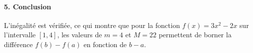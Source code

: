 \documentclass{article}
\newcounter{solution}
\begin{document}
\paragraph{5. Conclusion} L'inégalité est vérifiée, ce qui montre que pour la fonction \( f(x) = 3x^2 - 2x \) sur l'intervalle \([1, 4]\), les valeurs de \( m = 4 \) et \( M = 22 \) permettent de borner la différence \( f(b) - f(a) \) en fonction de \( b - a \).



\end{document}

